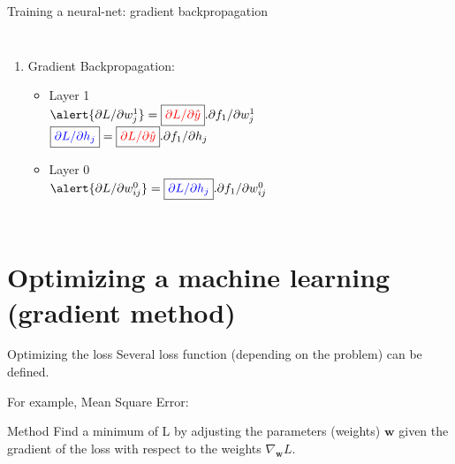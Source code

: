 \documentclass[handout]{beamer}
\begin{document}
\begin{frame}{Training a neural-net: gradient backpropagation}
\begin{columns}
\begin{enumerate}[<+->]
    \item \alert{Gradient Backpropagation:}
    \begin{itemize}
   \item Layer 1\\
   $\alert{\partial L/\partial w_j^1} = 
   \boxed{\color{red}\partial L/\partial \hat{y}}.
   \partial f_1 / \partial w^1_j$\\
   
   $ \boxed{\color{blue}\partial L/\partial h_j} = 
    \boxed{\color{red}\partial L/\partial \hat{y}}. 
   \partial f_1 / \partial h_j$
   
   \item Layer 0\\
   $\alert{\partial L/\partial w^0_{ij}}=
  \boxed{\color{blue}\partial L/\partial h_j}
   .\partial f_1 / \partial w^0_{ij}  $
    
    \end{itemize}
\end{enumerate}

\end{columns}

\end{frame}


\section{Optimizing a machine learning (gradient method)}

\begin{frame}{Optimizing the loss}
    Several loss function (depending on the problem) can be defined.
    
    For example, Mean Square Error:
    
    \begin{alertblock}{Method}
    Find a minimum of L by adjusting the parameters (weights) $\mathbf{w}$ given the gradient of the loss with respect to the weights $\nabla_\mathbf{w}L$.
    \end{alertblock}
\end{frame}
\end{document}
